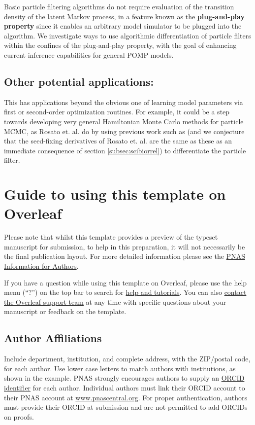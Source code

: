 \documentclass[9pt,twocolumn,twoside]{pnas-new}
\begin{document}
Basic particle filtering algorithms do not require evaluation of the transition density of the latent Markov process, in a feature known as the \textbf{plug-and-play property} \cite{Breto_timeseriesmech} since it enables an arbitrary model simulator to be plugged into the algorithm. We investigate ways to use algorithmic differentiation of particle filters within the confines of the plug-and-play property, with the goal of enhancing current inference capabilities for general POMP models.

\subsection*{Other potential applications:} This has applications beyond the obvious one of learning model parameters via first or second-order optimization routines. For example, it could be a step towards developing very general Hamiltonian Monte Carlo methods for particle MCMC, as Rosato et. al. \cite{rosato22b} do by using previous work such as \cite{scibior2021dpf, doucet2011sf} (and we conjecture that the seed-fixing derivatives of Rosato et. al. are the same as these as an immediate consequence of section \ref{subsec:scibiorrel}) to differentiate the particle filter. 

\section*{Guide to using this template on Overleaf}

Please note that whilst this template provides a preview of the typeset manuscript for submission, to help in this preparation, it will not necessarily be the final publication layout. For more detailed information please see the \href{https://www.pnas.org/page/authors/format}{PNAS Information for Authors}.

If you have a question while using this template on Overleaf, please use the help menu (``?'') on the top bar to search for \href{https://www.overleaf.com/help}{help and tutorials}. You can also \href{https://www.overleaf.com/contact}{contact the Overleaf support team} at any time with specific questions about your manuscript or feedback on the template.

\subsection*{Author Affiliations}

Include department, institution, and complete address, with the ZIP/postal code, for each author. Use lower case letters to match authors with institutions, as shown in the example. PNAS strongly encourages authors to supply an \href{https://orcid.org/}{ORCID identifier} for each author. Individual authors must link their ORCID account to their PNAS account at \href{http://www.pnascentral.org/}{www.pnascentral.org}. For proper authentication, authors must provide their ORCID at submission and are not permitted to add ORCIDs on proofs.
\end{document}
